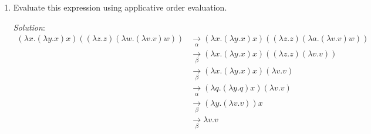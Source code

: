 \documentclass[]{article}
\begin{document}
\begin{enumerate}
\begin{enumerate}
\item Evaluate this expression using applicative order evaluation.
\item[\emph{Solution}:]
\begin{align*}
(\lambda x.(\lambda y.x)x)((\lambda z.z)(\lambda w.(\lambda v.v)w))
&\underset{\alpha}{\rightarrow}(\lambda x.(\lambda y.x)x)((\lambda z.z)(\lambda
a.(\lambda v.v)w))\\
&\underset{\beta}{\rightarrow}(\lambda x.(\lambda y.x)x)((\lambda z.z)(\lambda
v.v)) \\
&\underset{\beta}{\rightarrow}(\lambda x.(\lambda y.x)x)(\lambda v.v) \\
&\underset{\alpha}{\rightarrow}(\lambda q.(\lambda y.q)x)(\lambda v.v) \\
&\underset{\beta}{\rightarrow}(\lambda y.(\lambda v.v))x \\
&\underset{\beta}{\rightarrow}\lambda v.v
\end{align*}
\end{enumerate}


\end{enumerate}
\end{document}
